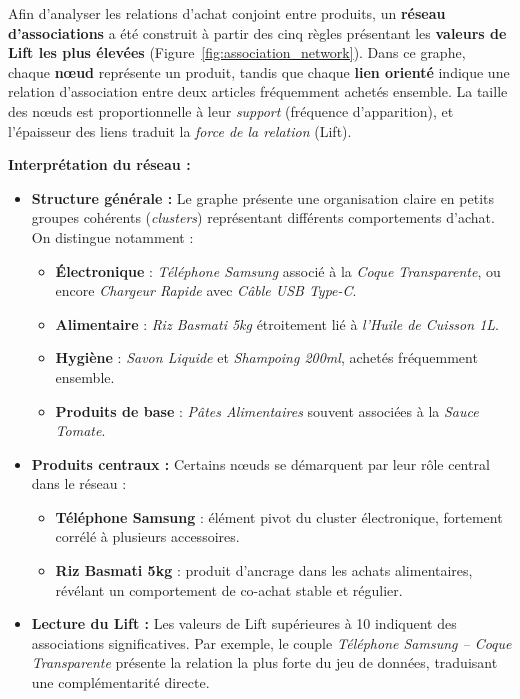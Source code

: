 \documentclass[a4paper,12pt]{article}
\begin{document}
Afin d'analyser les relations d'achat conjoint entre produits, un \textbf{réseau d'associations} a été construit à partir des cinq règles présentant les \textbf{valeurs de Lift les plus élevées} (Figure~\ref{fig:association_network}).  
Dans ce graphe, chaque \textbf{nœud} représente un produit, tandis que chaque \textbf{lien orienté} indique une relation d'association entre deux articles fréquemment achetés ensemble.  
La taille des nœuds est proportionnelle à leur \textit{support} (fréquence d'apparition), et l'épaisseur des liens traduit la \textit{force de la relation} (Lift).

\vspace{0.3cm}
\textbf{Interprétation du réseau :}
\begin{itemize}
    \item \textbf{Structure générale :}  
    Le graphe présente une organisation claire en petits groupes cohérents (\textit{clusters}) représentant différents comportements d'achat.  
    On distingue notamment :
    \begin{itemize}
        \item \textbf{Électronique} : \textit{Téléphone Samsung} associé à la \textit{Coque Transparente}, ou encore \textit{Chargeur Rapide} avec \textit{Câble USB Type-C}.  
        \item \textbf{Alimentaire} : \textit{Riz Basmati 5kg} étroitement lié à \textit{l'Huile de Cuisson 1L}.  
        \item \textbf{Hygiène} : \textit{Savon Liquide} et \textit{Shampoing 200ml}, achetés fréquemment ensemble.  
        \item \textbf{Produits de base} : \textit{Pâtes Alimentaires} souvent associées à la \textit{Sauce Tomate}.
    \end{itemize}

    \item \textbf{Produits centraux :}  
    Certains nœuds se démarquent par leur rôle central dans le réseau :
    \begin{itemize}
        \item \textbf{Téléphone Samsung} : élément pivot du cluster électronique, fortement corrélé à plusieurs accessoires.  
        \item \textbf{Riz Basmati 5kg} : produit d'ancrage dans les achats alimentaires, révélant un comportement de co-achat stable et régulier.  
    \end{itemize}

    \item \textbf{Lecture du Lift :}  
    Les valeurs de Lift supérieures à 10 indiquent des associations significatives.  
    Par exemple, le couple \textit{Téléphone Samsung -- Coque Transparente} présente la relation la plus forte du jeu de données, traduisant une complémentarité directe.
\end{itemize}
\end{document}
